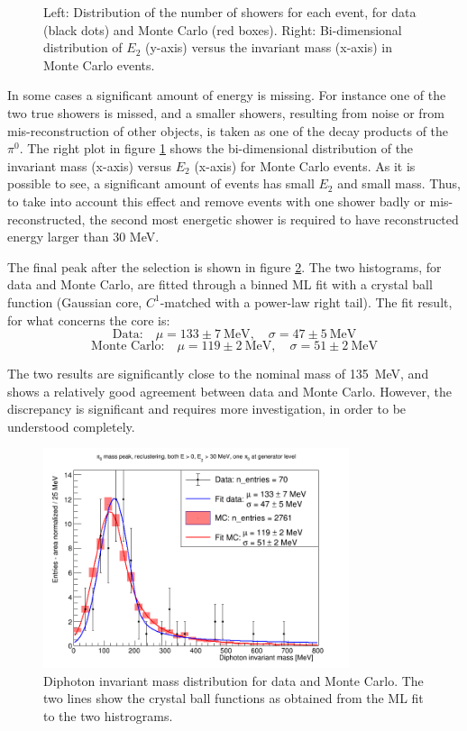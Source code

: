 \begin{figure}[!htbp]
\begin{minipage}{0.49\columnwidth}
\end{minipage}
\caption{Left: Distribution of the number of showers for each event, for data (black dots) and Monte Carlo (red boxes). Right: Bi-dimensional distribution of $E_2$ (y-axis) versus the invariant mass (x-axis) in Monte Carlo events.}
\label{fig:mc_mass_e2}
\end{figure}

In some cases a significant amount of energy is missing. For instance one of the two true showers is missed, and a smaller showers, resulting from noise or from mis-reconstruction of other objects, is taken as one of the decay products of the $\pi^0$. The right plot in figure \ref{fig:mc_mass_e2} shows the bi-dimensional distribution of the invariant mass (x-axis) versus $E_2$ (x-axis) for Monte Carlo events. As it is possible to see, a significant amount of events has small $E_2$ and small mass. Thus, to take into account this effect and remove events with one shower badly or mis-reconstructed, the second most energetic shower is required to have reconstructed energy larger than 30 MeV.

The final peak after the selection is shown in figure \ref{fig:pi0_mass_peak}. The two histograms, for data and Monte Carlo, are fitted through a binned ML fit with a crystal ball function (Gaussian core, $C^1$-matched with a power-law right tail). The fit result, for what concerns the core is:
\[ \text{Data:} \quad \mu = 133 \pm 7~\text{MeV}, \quad \sigma = 47 \pm 5~\text{MeV} \]
\[ \text{Monte Carlo:} \quad \mu = 119 \pm 2~\text{MeV}, \quad \sigma = 51 \pm 2~\text{MeV} \]

The two results are significantly close to the nominal mass of 135~MeV, and shows a relatively good agreement between data and Monte Carlo. However, the discrepancy is significant and requires more investigation, in order to be understood completely.

\begin{figure}[!htbp]
\centering
\includegraphics[width=0.8\textwidth]{_fig/data_mc_pi0_mass_peak_crb_cut_on_second_shower.png}
\caption{Diphoton invariant mass distribution for data and Monte Carlo. The two lines show the crystal ball functions as obtained from the ML fit to the two histrograms.} 
\label{fig:pi0_mass_peak}
\end{figure}

